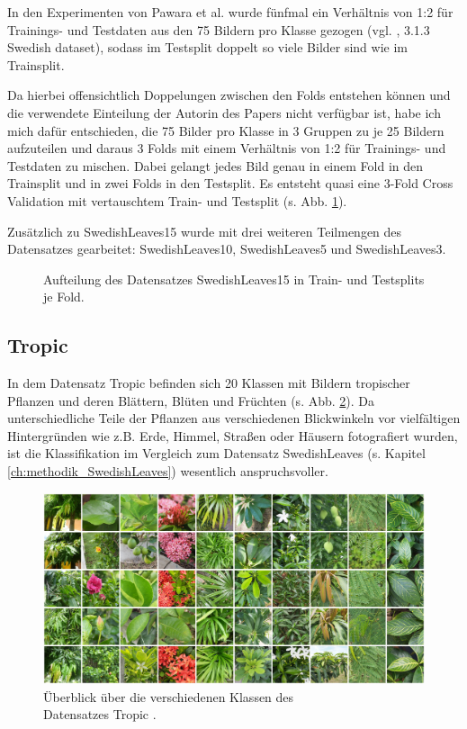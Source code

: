In den Experimenten von Pawara et al. \cite{pawaraPaper} wurde fünfmal ein Verhältnis von 1:2 für Trainings- und Testdaten aus den 75 Bildern pro Klasse gezogen (vgl. \cite{pawaraPaper}, 3.1.3 Swedish dataset), sodass im Testsplit doppelt so viele Bilder sind wie im Trainsplit.

Da hierbei offensichtlich Doppelungen zwischen den Folds entstehen können und die verwendete Einteilung der Autorin des Papers \cite{pawaraPaper} nicht verfügbar ist, habe ich mich dafür entschieden, die 75 Bilder pro Klasse in 3 Gruppen zu je 25 Bildern aufzuteilen und daraus 3 Folds mit einem Verhältnis von 1:2 für Trainings- und Testdaten zu mischen. Dabei gelangt jedes Bild genau in einem Fold in den Trainsplit und in zwei Folds in den Testsplit. Es entsteht quasi eine 3-Fold Cross Validation mit vertauschtem Train- und Testsplit (s. Abb. \ref{fig:swedishLeavesZusammensetzung}).

Zusätzlich zu SwedishLeaves15 wurde mit drei weiteren Teilmengen des Datensatzes gearbeitet: SwedishLeaves10, SwedishLeaves5 und SwedishLeaves3.

\begin{figure}[H]
\begin{adjustbox}{width=1.4\textwidth, center}

\end{adjustbox}
\caption{Aufteilung des Datensatzes SwedishLeaves15 \cite{swedishLeaves} in Train- und Testsplits je Fold.}
\label{fig:swedishLeavesZusammensetzung}
\end{figure}
\newpage
\subsection{Tropic}
\label{ch:methodik_Tropic}
In dem Datensatz Tropic \cite{pawaraWebsiteDatensaetze} befinden sich 20 Klassen mit Bildern tropischer Pflanzen und deren Blättern, Blüten und Früchten (s. Abb. \ref{fig:tropicUeberblick}). Da unterschiedliche Teile der Pflanzen aus verschiedenen Blickwinkeln vor vielfältigen Hintergründen wie z.B. Erde, Himmel, Straßen oder Häusern fotografiert wurden, ist die Klassifikation im Vergleich zum Datensatz SwedishLeaves \cite{swedishLeaves} (s. Kapitel \ref{ch:methodik_SwedishLeaves}) wesentlich anspruchsvoller.


\begin{figure}[H]
\centering
\includegraphics[scale=0.14]{img/2_tropic10-image.jpg}
\caption{Überblick über die verschiedenen Klassen des\\
Datensatzes Tropic \cite{pawaraTropic}.}
\label{fig:tropicUeberblick}
\end{figure}

